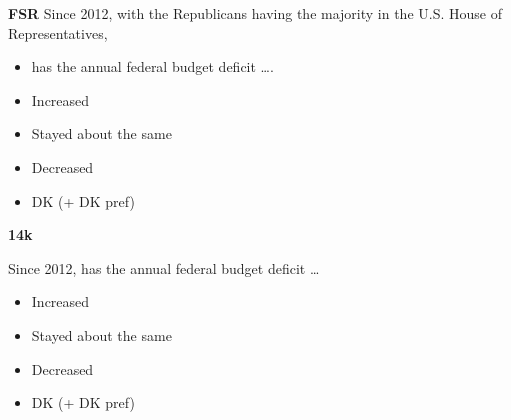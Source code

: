 \documentclass[12pt, letterpaper]{article}
\begin{document}
\begin{itemize}
\textbf{FSR}\newline
Since 2012, with the Republicans having the majority in the U.S. House of
Representatives,
\begin{itemize}
	\item has the annual federal budget deficit \ldots.
	\item Increased
	\item Stayed about the same
	\item Decreased
	\item DK (+ DK pref)
\end{itemize}

\textbf{14k}\newline

Since 2012, has the annual federal budget deficit \ldots
\begin{itemize}
	\item Increased
	\item Stayed about the same
	\item Decreased
	\item DK (+ DK pref) 
\end{itemize}
\end{itemize}
\end{document}
